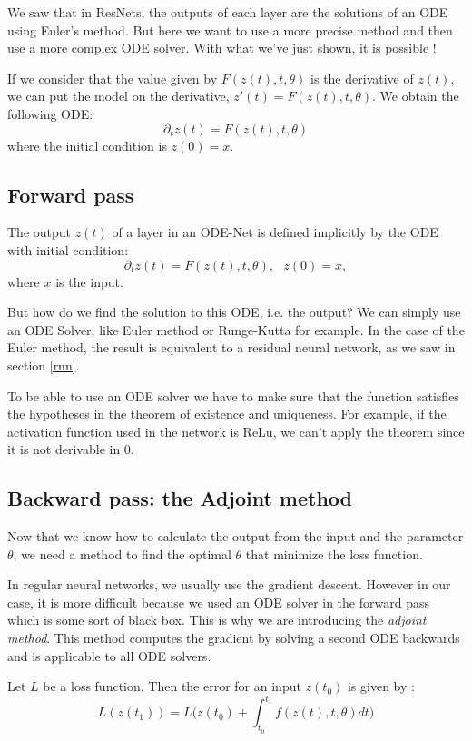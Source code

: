 \documentclass[10pt,a4paper]{article}
\theoremstyle{definition}
\theoremstyle{definition}
\theoremstyle{definition}
\begin{document}
We saw that in ResNets, the outputs of each layer are the solutions of an ODE using Euler's method. But here we want to use a more precise method and then use a more complex ODE solver. With what we've just shown, it is possible !

If we consider that the value given by $F(z(t), t, \theta)$ is the derivative of $z(t)$, we can put the model on the derivative, $z'(t) = F(z(t), t, \theta)$.  We obtain the following ODE:
$$ \partial_t z(t) = F(z(t), t, \theta) $$
where the initial condition is $z(0) = x$. 

\subsection{Forward pass}

The output $z(t)$ of a layer in an ODE-Net is defined implicitly by the ODE with initial condition:
$$ \partial_t z(t) = F(z(t), t, \theta), \ \ \ z(0) = x, $$
where $x$ is the input.

But how do we find the solution to this ODE, i.e. the output? We can simply use an ODE Solver, like Euler method or Runge-Kutta for example. In the case of the Euler method, the result is equivalent to a residual neural network, as we saw in section \ref{rnn}.

To be able to use an ODE solver we have to make sure that the function satisfies the hypotheses in the theorem of existence and uniqueness. For example, if the activation function used in the network is ReLu, we can't apply the theorem since it is not derivable in $0$.

\subsection{Backward pass: the Adjoint method}
Now that we know how to calculate the output from the input and the parameter $\theta$, we need a method to find the optimal $\theta$ that minimize the loss function.

In regular neural networks, we usually use the gradient descent. However in our case, it is more difficult because we used an ODE solver in the forward pass which is some sort of black box. This is why we are introducing the \textit{adjoint method}. This method computes the gradient by solving a second ODE backwards and is applicable to all ODE solvers.

Let $L$ be a loss function. Then the error for an input $z(t_0)$ is given by :
$$
L(z(t_1)) = L \big( z(t_0) + \int_{t_0}^{t_1} f(z(t),t,\theta) dt \big)
$$
\end{document}

